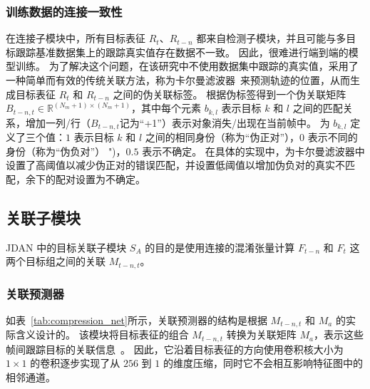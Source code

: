 \subsubsection{训练数据的连接一致性}
在连接子模块中，所有目标表征 $R_t$、$R_{t-n}$ 都来自检测子模块，并且可能与多目标跟踪基准数据集上的跟踪真实值存在数据不一致。
因此，很难进行端到端的模型训练。
为了解决这个问题，在该研究中不使用数据集中跟踪的真实值，采用了一种简单而有效的传统关联方法，称为卡尔曼滤波器~\cite{welch1995introduction}来预测轨迹的位置，从而生成目标表征 $R_t$ 和 $R_{t-n}$ 之间的伪关联标签。
根据伪标签得到一个伪关联矩阵 $B_{t-n,t} \in \mathbb{R}^{(N_m+1) \times (N_m+1)}$，其中每个元素 $b_{k,l}$ 表示目标 $k$ 和 $l$ 之间的匹配关系，增加一列/行（$B_{t-n,t}$记为“+1”）表示对象消失/出现在当前帧中。
为 $b_{k,l}$ 定义了三个值：$1$ 表示目标 $k$ 和 $l$ 之间的相同身份（称为“伪正对”），$0$ 表示不同的身份（称为“伪负对”） ")，$0.5$ 表示不确定。
在具体的实现中，为卡尔曼滤波器中设置了高阈值以减少伪正对的错误匹配，并设置低阈值以增加伪负对的真实不匹配，余下的配对设置为不确定。

%


\subsection{关联子模块}
\label{sec:association_submodule}
JDAN 中的目标关联子模块 $S_A$ 的目的是使用连接的混淆张量计算 $F_{t-n}$ 和 $F_t$ 这两个目标组之间的关联 $M_{t-n,t}$。

\subsubsection{关联预测器}
\label{sec:similarity_estimator}
如表~\ref{tab:compression_net}所示，关联预测器的结构是根据 $M_{t-n,t}$ 和 $M_a$ 的实际含义设计的。
该模块将目标表征的组合 $M_{t-n,t}$ 转换为关联矩阵 $M_a$，表示这些帧间跟踪目标的关联信息~\cite{dan}。
因此，它沿着目标表征的方向使用卷积核大小为 $1\times 1$ 的卷积逐步实现了从 $256$ 到 $1$ 的维度压缩，同时它不会相互影响特征图中的相邻通道。



